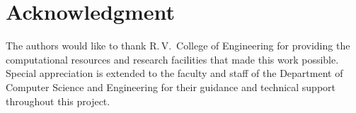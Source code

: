 \documentclass{ieeeaccess}
\begin{document}
\section*{Acknowledgment}

The authors would like to thank R.\,V.\ College of Engineering for 
providing the computational resources and research facilities that 
made this work possible. Special appreciation is extended to the 
faculty and staff of the Department of Computer Science and 
Engineering for their guidance and technical support throughout 
this project.

\end{document}
